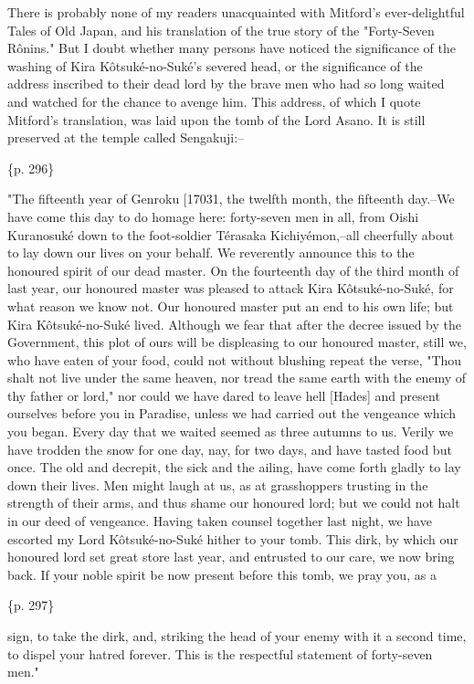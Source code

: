 There is probably none of my readers unacquainted with Mitford's ever-delightful Tales of Old Japan, and his translation of the true story of the "Forty-Seven Rônins." But I doubt whether many persons have noticed the significance of the washing of Kira Kôtsuké-no-Suké's severed head, or the significance of the address inscribed to their dead lord by the brave men who had so long waited and watched for the chance to avenge him. This address, of which I quote Mitford's translation, was laid upon the tomb of the Lord Asano. It is still preserved at the temple called Sengakuji:--

\{p. 296\}

"The fifteenth year of Genroku [17031, the twelfth month, the fifteenth day.--We have come this day to do homage here: forty-seven men in all, from Oishi Kuranosuké down to the foot-soldier Térasaka Kichiyémon,--all cheerfully about to lay down our lives on your behalf. We reverently announce this to the honoured spirit of our dead master. On the fourteenth day of the third month of last year, our honoured master was pleased to attack Kira Kôtsuké-no-Suké, for what reason we know not. Our honoured master put an end to his own life; but Kira Kôtsuké-no-Suké lived. Although we fear that after the decree issued by the Government, this plot of ours will be displeasing to our honoured master, still we, who have eaten of your food, could not without blushing repeat the verse, "Thou shalt not live under the same heaven, nor tread the same earth with the enemy of thy father or lord," nor could we have dared to leave hell [Hades] and present ourselves before you in Paradise, unless we had carried out the vengeance which you began. Every day that we waited seemed as three autumns to us. Verily we have trodden the snow for one day, nay, for two days, and have tasted food but once. The old and decrepit, the sick and the ailing, have come forth gladly to lay down their lives. Men might laugh at us, as at grasshoppers trusting in the strength of their arms, and thus shame our honoured lord; but we could not halt in our deed of vengeance. Having taken counsel together last night, we have escorted my Lord Kôtsuké-no-Suké hither to your tomb. This dirk, by which our honoured lord set great store last year, and entrusted to our care, we now bring back. If your noble spirit be now present before this tomb, we pray you, as a

\{p. 297\}

sign, to take the dirk, and, striking the head of your enemy with it a second time, to dispel your hatred forever. This is the respectful statement of forty-seven men."

